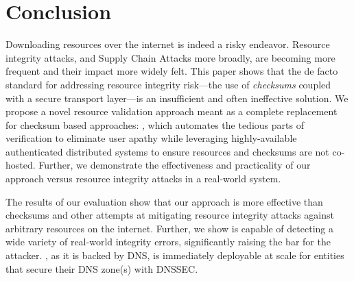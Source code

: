 \section{Conclusion} \label{sec:conclusion}

Downloading resources over the internet is indeed a risky endeavor. Resource
integrity attacks, and Supply Chain Attacks more broadly, are becoming more
frequent and their impact more widely felt. This paper shows that the de facto
standard for addressing resource integrity risk---the use of \emph{checksums}
coupled with a secure transport layer---is an insufficient and often ineffective
solution. We propose a novel resource validation approach meant as a complete
replacement for checksum based approaches: \SYSTEM{}, which automates the
tedious parts of verification to eliminate user apathy while leveraging
highly-available authenticated distributed systems to ensure resources and
checksums are not co-hosted. Further, we demonstrate the effectiveness and
practicality of our approach versus resource integrity attacks in a real-world
system.

The results of our evaluation show that our approach is more effective than
checksums and other attempts at mitigating resource integrity attacks
against arbitrary resources on the internet. Further, we show \DNSSYS{} is
capable of detecting a wide variety of real-world integrity errors,
significantly raising the bar for the attacker. \DNSSYS{}, as it is backed by
DNS, is immediately deployable at scale for entities that secure their DNS
zone(s) with DNSSEC.
